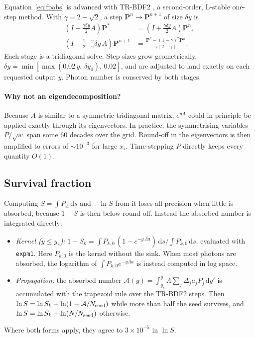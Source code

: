 \documentclass[11pt]{article}
\newcommand{\dd}{\mathrm{d}}
\begin{document}
Equation~\eqref{eq:fpabs} is advanced with TR-BDF2 \citep{bank1985,hosea1996},
a second-order, L-stable one-step method. With $\gamma=2-\sqrt2$, a step
$\mathbf P^n\to\mathbf P^{n+1}$ of size $\delta y$ is
\begin{align}
  \left(I-\tfrac{\gamma\delta y}{2}A\right)\mathbf P^{*}
    &= \left(I+\tfrac{\gamma\delta y}{2}A\right)\mathbf P^{n},\\
  \left(I-\tfrac{1-\gamma}{2-\gamma}\delta y\,A\right)\mathbf P^{n+1}
    &= \frac{\mathbf P^{*}-(1-\gamma)^2\mathbf P^n}{\gamma(2-\gamma)} .
\end{align}
Each stage is a tridiagonal solve. Step sizes grow geometrically,
$\delta y=\min[\max(0.02\,y,\,\delta y_0),\,0.02]$, and are adjusted to land
exactly on each requested output $y$. Photon number is conserved by both
stages.

\paragraph{Why not an eigendecomposition?} Because $A$ is similar to a
symmetric tridiagonal matrix, $e^{yA}$ could in principle be applied exactly
through its eigenvectors. In practice, the symmetrising variables
$P/\sqrt{w}$ span some 60 decades over the grid. Round-off in the
eigenvectors is then amplified to errors of $\sim10^{-3}$ for large $x_i$.
Time-stepping $P$ directly keeps every quantity $O(1)$.

\subsection{Survival fraction}\label{sec:survival}

Computing $S=\int P_\Lambda\,\dd s$ and $-\ln S$ from it loses all precision
when little is absorbed, because $1-S$ is then below round-off. Instead the
absorbed number is integrated directly:
\begin{itemize}
\item \emph{Kernel ($y\le y_s$):}
  $1-S_k = \int P_{k,0}\,(1-e^{-y\,\overline{\Lambda a}})\,\dd s \big/ \int P_{k,0}\,\dd s$,
  evaluated with \texttt{expm1}. Here $P_{k,0}$ is the kernel without the sink.
  When most photons are absorbed, the logarithm of
  $\int P_{k,0}e^{-y\overline{\Lambda a}}$ is instead computed in log space.
\item \emph{Propagation:} the absorbed number
  $\mathcal A(y)=\int_{y_s}^{y}\Lambda\sum_j\Delta_j a_jP_j\,\dd y'$ is
  accumulated with the trapezoid rule over the TR-BDF2 steps. Then
  $\ln S = \ln S_k + \ln(1-\mathcal A/N_{\rm seed})$ while more than half
  the seed survives, and $\ln S=\ln S_k+\ln(N/N_{\rm seed})$ otherwise.
\end{itemize}
Where both forms apply, they agree to $3\times10^{-5}$ in $\ln S$.
\end{document}
